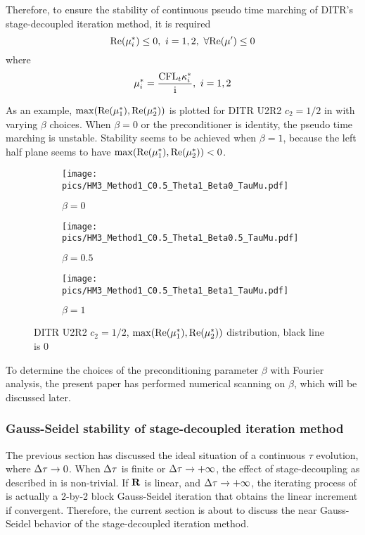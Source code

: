 Therefore, to ensure the stability of continuous pseudo time
marching of DITR's stage-decoupled iteration method, it is
required
\begin{equation}
    \mathrm{Re}(\mu^*_i) \leq 0,\  i = 1,2,\  \forall \mathrm{Re}(\mu') \leq 0
\end{equation}
where
\begin{equation}
    \mu^*_i = \frac{\text{CFL}_t\kappa^*_i}{\mathrm{i}},\ i=1,2
\end{equation}

As an example, $\max(\mathrm{Re}(\mu^*_1),\mathrm{Re}(\mu^*_2))$ is plotted for
DITR U2R2 $c_2=1/2$ in  with varying $\beta$ choices.
When $\beta = 0$ or the preconditioner is identity, the pseudo time marching is
unstable. Stability seems to be achieved when $\beta = 1$, because
the left half plane seems to have $\max(\mathrm{Re}(\mu^*_1),\mathrm{Re}(\mu^*_2)) < 0$.
\begin{figure}[htbp]
    \centering
    \begin{subfigure}{0.33\textwidth}
        \texttt{[image: pics/HM3\_Method1\_C0.5\_Theta1\_Beta0\_TauMu.pdf]}
        \caption[]{$\beta = 0$}
    \end{subfigure}\hfill
    \begin{subfigure}{0.33\textwidth}
        \texttt{[image: pics/HM3\_Method1\_C0.5\_Theta1\_Beta0.5\_TauMu.pdf]}
        \caption[]{$\beta = 0.5$}
    \end{subfigure}\hfill
    \begin{subfigure}{0.33\textwidth}
        \texttt{[image: pics/HM3\_Method1\_C0.5\_Theta1\_Beta1\_TauMu.pdf]}
        \caption[]{$\beta = 1$}
    \end{subfigure}
    \caption{DITR U2R2 $c_2=1/2$, $\max(\mathrm{Re}(\mu^*_1),\mathrm{Re}(\mu^*_2))$ distribution, black line is 0}
    \label{fig:MuU2R2}
\end{figure}

To determine the choices of the preconditioning parameter  $\beta$
with Fourier analysis, the
present paper has performed numerical scanning
on $\beta$, which will be discussed later.

\subsubsection{Gauss-Seidel stability of stage-decoupled iteration method}
\label{sssec:GSStability}

The previous section has discussed the ideal
situation of a continuous $\tau$ evolution, where
${\Delta} \tau \rightarrow 0$. When ${\Delta} \tau$ is finite
or ${\Delta} \tau \rightarrow +\infty$,
the effect of stage-decoupling as described in 
is non-trivial.
If $\mathbf{R}$ is linear, and ${\Delta} \tau \rightarrow +\infty$,
the iterating process of  is
actually a 2-by-2 block Gauss-Seidel iteration that obtains
the linear increment if convergent.
Therefore, the current section is about to discuss the
near Gauss-Seidel behavior of the stage-decoupled iteration method.


